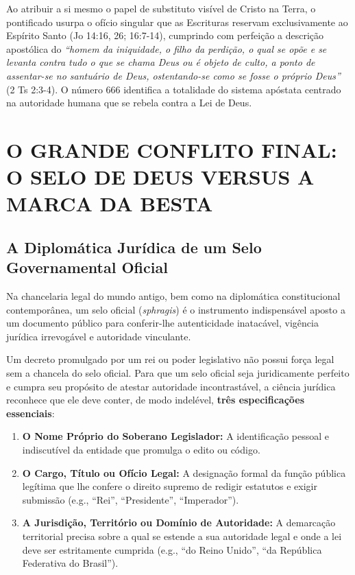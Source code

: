 \documentclass[11pt,a4paper,openany]{book}
\begin{document}
Ao atribuir a si mesmo o papel de substituto visível de Cristo na Terra, o pontificado usurpa o ofício singular que as Escrituras reservam exclusivamente ao Espírito Santo (Jo 14:16, 26; 16:7-14), cumprindo com perfeição a descrição apostólica do \textit{``homem da iniquidade, o filho da perdição, o qual se opõe e se levanta contra tudo o que se chama Deus ou é objeto de culto, a ponto de assentar-se no santuário de Deus, ostentando-se como se fosse o próprio Deus''} (2 Ts 2:3-4). O número 666 identifica a totalidade do sistema apóstata centrado na autoridade humana que se rebela contra a Lei de Deus.



\section{O GRANDE CONFLITO FINAL: O SELO DE DEUS VERSUS A MARCA DA BESTA}



\subsection{A Diplomática Jurídica de um Selo Governamental Oficial}


Na chancelaria legal do mundo antigo, bem como na diplomática constitucional contemporânea, um selo oficial (\textit{sphragis}) é o instrumento indispensável aposto a um documento público para conferir-lhe autenticidade inatacável, vigência jurídica irrevogável e autoridade vinculante.

Um decreto promulgado por um rei ou poder legislativo não possui força legal sem a chancela do selo oficial. Para que um selo oficial seja juridicamente perfeito e cumpra seu propósito de atestar autoridade incontrastável, a ciência jurídica reconhece que ele deve conter, de modo indelével, \textbf{três especificações essenciais}:

\begin{enumerate}
  \item \textbf{O Nome Próprio do Soberano Legislador:} A identificação pessoal e indiscutível da entidade que promulga o edito ou código.
  \item \textbf{O Cargo, Título ou Ofício Legal:} A designação formal da função pública legítima que lhe confere o direito supremo de redigir estatutos e exigir submissão (e.g., ``Rei'', ``Presidente'', ``Imperador'').
  \item \textbf{A Jurisdição, Território ou Domínio de Autoridade:} A demarcação territorial precisa sobre a qual se estende a sua autoridade legal e onde a lei deve ser estritamente cumprida (e.g., ``do Reino Unido'', ``da República Federativa do Brasil'').
\end{enumerate}
\end{document}
